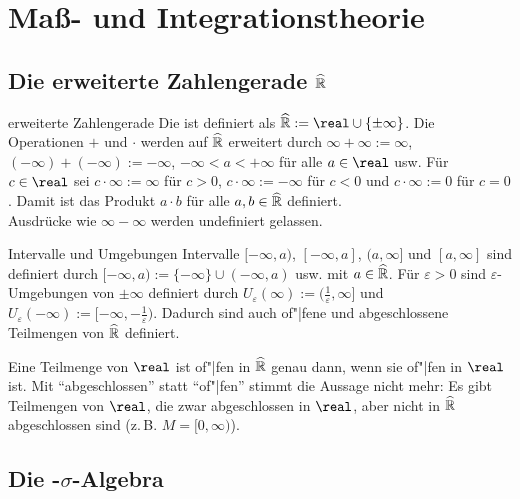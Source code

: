 \section{%
    Maß- und Integrationstheorie%
}

\subsection{%
    Die erweiterte Zahlengerade\texorpdfstring{ $\widehat{\mathbb{R}}$}{}%
}

\begin{Def}{erweiterte Zahlengerade}
    Die  ist definiert als
    $\extreal := \real \cup \{\pm \infty\}$.
    Die Operationen $+$ und $\cdot$ werden auf $\widehat{\mathbb{R}}$ erweitert durch
    $\infty + \infty := \infty$, $(-\infty) + (-\infty) := -\infty$,
    $-\infty < a < +\infty$ für alle $a \in \real$ usw.
    Für $c \in \real$ sei $c \cdot \infty := \infty$ für $c > 0$,
    $c \cdot \infty := -\infty$ für $c < 0$ und $c \cdot \infty := 0$ für $c = 0$.
    Damit ist das Produkt $a \cdot b$ für alle $a, b \in \widehat{\mathbb{R}}$ definiert.\\
    Ausdrücke wie $\infty - \infty$ werden undefiniert gelassen.
\end{Def}

\begin{Def}{Intervalle und Umgebungen}
    Intervalle $[-\infty, a)$, $[-\infty, a]$, $(a, \infty]$ und $[a, \infty]$ sind definiert
    durch $[-\infty, a) := \{-\infty\} \cup (-\infty, a)$ usw. mit $a \in \widehat{\mathbb{R}}$.
    Für $\varepsilon > 0$ sind $\varepsilon$-Umgebungen von $\pm \infty$ definiert durch
    $U_\varepsilon(\infty) := (\frac{1}{\varepsilon}, \infty]$ und
    $U_\varepsilon(-\infty) := [-\infty, -\frac{1}{\varepsilon})$.
    Dadurch sind auch of"|fene und abgeschlossene Teilmengen von $\widehat{\mathbb{R}}$ definiert.
\end{Def}

\begin{Bem}
    Eine Teilmenge von $\real$ ist of"|fen in $\widehat{\mathbb{R}}$ genau dann,
    wenn sie of"|fen in $\real$ ist.
    Mit "`abgeschlossen"' statt "`of"|fen"' stimmt die Aussage nicht mehr:
    Es gibt Teilmengen von $\real$, die zwar abgeschlossen in $\real$, aber nicht in $\widehat{\mathbb{R}}$
    abgeschlossen sind (z.\,B. $M = [0, \infty)$).
\end{Bem}

\subsection{%
    Die -\texorpdfstring{$\sigma$}{σ}-Algebra%
}

